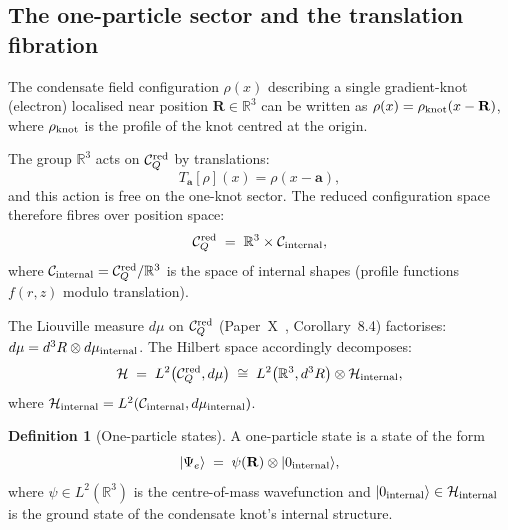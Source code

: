 \documentclass[11pt,a4paper]{article}
\theoremstyle{definition}
\newtheorem{definition}[theorem]{Definition}
\theoremstyle{remark}
\begin{document}
\subsection{The one-particle sector and the translation fibration}
\label{P13:sec:translation_fibration}

The condensate field configuration $\rho(x)$ describing a single
gradient-knot (electron) localised near position $\mathbf{R}\in\mathbb{R}^3$
can be written as $\rho(x) = \rho_{\rm knot}(x-\mathbf{R})$,
where $\rho_{\rm knot}$ is the profile of the knot centred at the origin.

The group $\mathbb{R}^3$ acts on $\mathcal{C}_Q^{\rm red}$ by translations:
\begin{equation}
  T_{\mathbf{a}}[\rho](x) = \rho(x-\mathbf{a}),
  \label{P13:eq:translation_action}
\end{equation}
and this action is free on the one-knot sector.
The reduced configuration space therefore fibres over position space:
\begin{equation}
  \mathcal{C}_Q^{\rm red} \;=\; \mathbb{R}^3 \times \mathcal{C}_{\rm internal},
  \label{P13:eq:fibration}
\end{equation}
where $\mathcal{C}_{\rm internal} = \mathcal{C}_Q^{\rm red}/\mathbb{R}^3$
is the space of internal shapes (profile functions
$f(r,z)$ modulo translation).

The Liouville measure $d\mu$ on $\mathcal{C}_Q^{\rm red}$
(Paper~X~\cite{Paper10}, Corollary~8.4) factorises:
$d\mu = d^3R\otimes d\mu_{\rm internal}$.
The Hilbert space accordingly decomposes:
\begin{equation}
  \mathcal{H}
  \;=\; L^2\!\left(\mathcal{C}_Q^{\rm red},d\mu\right)
  \;\cong\;
  L^2\!\left(\mathbb{R}^3,d^3R\right)\otimes\mathcal{H}_{\rm internal},
  \label{P13:eq:Hilbert_factorisation}
\end{equation}
where $\mathcal{H}_{\rm internal} = L^2(\mathcal{C}_{\rm internal},d\mu_{\rm internal})$.

\begin{definition}[One-particle states]
\label{P13:def:one_particle}
A one-particle state is a state of the form
\begin{equation}
  |\Psi_e\rangle \;=\; \psi(\mathbf{R})\otimes|0_{\rm internal}\rangle,
  \label{P13:eq:one_particle_state}
\end{equation}
where $\psi\in L^2(\mathbb{R}^3)$ is the centre-of-mass wavefunction
and $|0_{\rm internal}\rangle\in\mathcal{H}_{\rm internal}$
is the ground state of the condensate knot's internal structure.
\end{definition}
\end{document}
